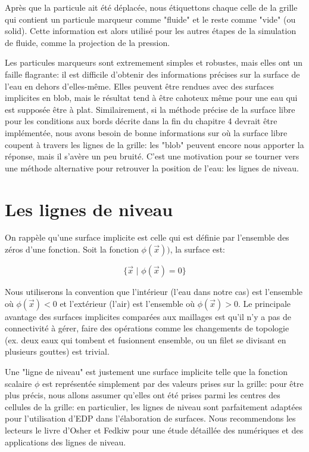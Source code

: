 \documentclass[11pt]{report}
\begin{document}
Après que la particule ait été déplacée, nous étiquettons chaque celle de la grille qui contient un particule marqueur comme "fluide" et le reste comme "vide" (ou solid). Cette information est alors utilisé pour les autres étapes de la simulation de fluide, comme la projection de la pression.\newline

Les particules marqueurs sont extremement simples et robustes, mais elles ont un faille flagrante: il est difficile d'obtenir des informations précises sur la surface de l'eau en dehors d'elles-même. Elles peuvent être rendues avec des surfaces implicites en blob, mais le résultat tend à être cahoteux même pour une eau qui est supposée être à plat. Similairement, si la méthode précise de la surface libre pour les conditions aux bords décrite dans la fin du chapitre 4 devrait être implémentée, nous avons besoin de bonne informations sur où la surface libre coupent à travers les lignes de la grille: les "blob" peuvent encore nous apporter la réponse, mais il s'avère un peu bruité. C'est une motivation pour se tourner vers une méthode alternative pour retrouver la position de l'eau: les lignes de niveau. \newline

\section{Les lignes de niveau}

On rappèle qu'une surface implicite est celle qui est définie par l'ensemble des zéros d'une fonction. Soit la fonction $\phi(\overrightarrow{x}))$, la surface est:

\begin{equation}
\{\overrightarrow{x} \,\, | \,\, \phi(\overrightarrow{x}) = 0\}
\end{equation}

Nous utiliserons la convention que l'intérieur (l'eau dans notre cas) est l'ensemble où $\phi(\overrightarrow{x}) < 0$ et l'extérieur (l'air) est l'ensemble où $\phi(\overrightarrow{x}) > 0$. Le principale avantage des surfaces implicites comparées aux maillages est qu'il n'y a pas de connectivité à gérer, faire des opérations comme les changements de topologie (ex. deux eaux qui tombent et fusionnent ensemble, ou un filet se divisant en plusieurs gouttes) est trivial.\newline

Une "ligne de niveau" est justement une surface implicite telle que la fonction scalaire $\phi$ est représentée simplement par des valeurs prises sur la grille: pour être plus précis, nous allons assumer qu'elles ont été prises parmi les centres des cellules de la grille: en particulier, les lignes de niveau sont parfaitement adaptées pour l'utilisation d'EDP dans l'élaboration de surfaces. Nous recommendons les lecteurs le livre d'Osher et Fedkiw \cite{osher-fedkiw-2002} pour une étude détaillée des numériques et des applications des lignes de niveau.\newline
\end{document}

